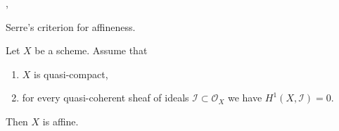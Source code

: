 \begin{lemma}
\label{lemma-quasi-compact-h1-zero-covering}
\begin{reference}
\cite{Serre-criterion}, \cite[II, Theorem 5.2.1 (d') and IV (1.7.17)]{EGA}
\end{reference}
\begin{slogan}
Serre's criterion for affineness.
\end{slogan}
Let $X$ be a scheme.
Assume that
\begin{enumerate}
\item $X$ is quasi-compact,
\item for every quasi-coherent sheaf of ideals
$\mathcal{I} \subset \mathcal{O}_X$ we have $H^1(X, \mathcal{I}) = 0$.
\end{enumerate}
Then $X$ is affine.
\end{lemma}

